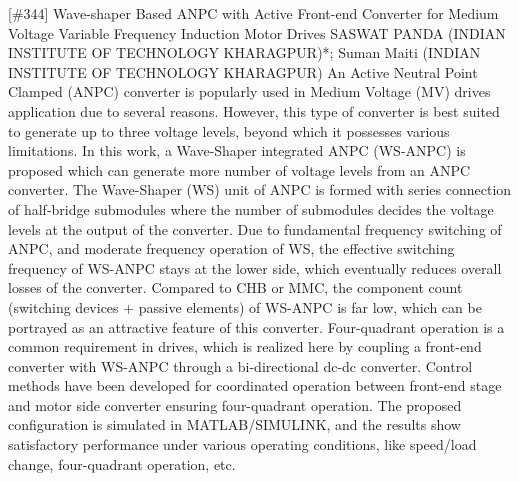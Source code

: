 {} \begin{abstract_online} {[\#344] Wave-shaper Based ANPC with Active Front-end Converter for Medium Voltage Variable Frequency Induction Motor Drives } {} {SASWAT PANDA (INDIAN INSTITUTE OF TECHNOLOGY KHARAGPUR)*; Suman  Maiti (INDIAN INSTITUTE OF TECHNOLOGY KHARAGPUR)} {} An Active Neutral Point Clamped (ANPC) converter is popularly used in Medium Voltage (MV) drives application due to several reasons. However, this type of converter is best suited to generate up to three voltage levels, beyond which it possesses various limitations. In this work, a Wave-Shaper integrated ANPC (WS-ANPC) is proposed which can generate more number of voltage levels from an ANPC converter. The Wave-Shaper (WS) unit of ANPC is formed with series connection of half-bridge submodules where the number of submodules decides the voltage levels at the output of the converter. Due to fundamental frequency switching of ANPC, and moderate frequency operation of WS, the effective switching frequency of WS-ANPC stays at the lower side, which eventually reduces overall losses of the converter. Compared to CHB or MMC, the component count (switching devices + passive elements) of WS-ANPC is far low, which can be portrayed as an attractive feature of this converter. Four-quadrant operation is a common requirement in drives, which is realized here by coupling a front-end converter with WS-ANPC through a bi-directional dc-dc converter. Control methods have been developed for coordinated operation between front-end stage and motor side converter ensuring four-quadrant operation. The proposed configuration is simulated in MATLAB/SIMULINK, and the results show satisfactory performance under various operating conditions, like speed/load change, four-quadrant operation, etc.  \end{abstract_online} 
